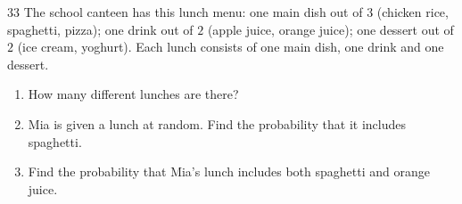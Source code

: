 \documentclass[11pt]{article}
\newenvironment{probbox}[2]{\begin{probboxT}{#1}{#2}}{\end{probboxT}}
\begin{document}
\begin{probbox}{33}{\relax}
The school canteen has this lunch menu: one main dish out of $3$ (chicken rice, spaghetti, pizza); one drink out of $2$ (apple juice, orange juice); one dessert out of $2$ (ice cream, yoghurt). Each lunch consists of one main dish, one drink and one dessert.
\begin{enumerate}[label=\alph*),leftmargin=1.5em,itemsep=0pt,topsep=2pt]
\item How many different lunches are there?
\item Mia is given a lunch at random. Find the probability that it includes spaghetti.
\item Find the probability that Mia's lunch includes both spaghetti and orange juice.
\end{enumerate}
\end{probbox}
\end{document}
